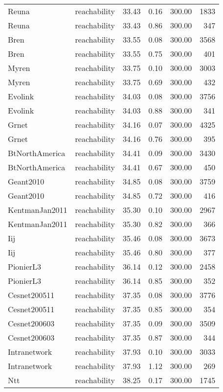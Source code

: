 \begin{tabular}{llrrrr}
Reuna & reachability & 33.43 & 0.16 & 300.00 & 1833 \\
Reuna & reachability & 33.43 & 0.86 & 300.00 & 347 \\
Bren & reachability & 33.55 & 0.08 & 300.00 & 3568 \\
Bren & reachability & 33.55 & 0.75 & 300.00 & 401 \\
Myren & reachability & 33.75 & 0.10 & 300.00 & 3003 \\
Myren & reachability & 33.75 & 0.69 & 300.00 & 432 \\
Evolink & reachability & 34.03 & 0.08 & 300.00 & 3756 \\
Evolink & reachability & 34.03 & 0.88 & 300.00 & 341 \\
Grnet & reachability & 34.16 & 0.07 & 300.00 & 4325 \\
Grnet & reachability & 34.16 & 0.76 & 300.00 & 395 \\
BtNorthAmerica & reachability & 34.41 & 0.09 & 300.00 & 3430 \\
BtNorthAmerica & reachability & 34.41 & 0.67 & 300.00 & 450 \\
Geant2010 & reachability & 34.85 & 0.08 & 300.00 & 3759 \\
Geant2010 & reachability & 34.85 & 0.72 & 300.00 & 416 \\
KentmanJan2011 & reachability & 35.30 & 0.10 & 300.00 & 2967 \\
KentmanJan2011 & reachability & 35.30 & 0.82 & 300.00 & 366 \\
Iij & reachability & 35.46 & 0.08 & 300.00 & 3673 \\
Iij & reachability & 35.46 & 0.80 & 300.00 & 377 \\
PionierL3 & reachability & 36.14 & 0.12 & 300.00 & 2458 \\
PionierL3 & reachability & 36.14 & 0.85 & 300.00 & 352 \\
Cesnet200511 & reachability & 37.35 & 0.08 & 300.00 & 3776 \\
Cesnet200511 & reachability & 37.35 & 0.85 & 300.00 & 354 \\
Cesnet200603 & reachability & 37.35 & 0.09 & 300.00 & 3509 \\
Cesnet200603 & reachability & 37.35 & 0.87 & 300.00 & 344 \\
Intranetwork & reachability & 37.93 & 0.10 & 300.00 & 3033 \\
Intranetwork & reachability & 37.93 & 1.12 & 300.00 & 269 \\
Ntt & reachability & 38.25 & 0.17 & 300.00 & 1745 \\

\end{tabular}
